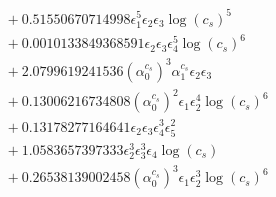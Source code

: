 \documentclass[10pt]{article}
\begin{document}
\begin{align*}
&{}  + 0.51550670714998 \epsilon_{1}^{5} \epsilon_{2} \epsilon_{3} \log{\left(c_{s} \right)}^{5} \\
&{}  + 0.0010133849368591 \epsilon_{2} \epsilon_{3} \epsilon_{4}^{5} \log{\left(c_{s} \right)}^{6} \\
&{}  + 2.0799619241536 \left(\alpha_{0}^{c_s}\right)^{3} \alpha_{1}^{c_s} \epsilon_{2} \epsilon_{3} \\
&{}  + 0.13006216734808 \left(\alpha_{0}^{c_s}\right)^{2} \epsilon_{1} \epsilon_{2}^{4} \log{\left(c_{s} \right)}^{6} \\
&{}  + 0.13178277164641 \epsilon_{2} \epsilon_{3} \epsilon_{4}^{3} \epsilon_{5}^{2} \\
&{}  + 1.0583657397333 \epsilon_{2}^{3} \epsilon_{3}^{3} \epsilon_{4} \log{\left(c_{s} \right)} \\
&{}  + 0.26538139002458 \left(\alpha_{0}^{c_s}\right)^{3} \epsilon_{1} \epsilon_{2}^{3} \log{\left(c_{s} \right)}^{6}
\end{align*}
\end{document}
